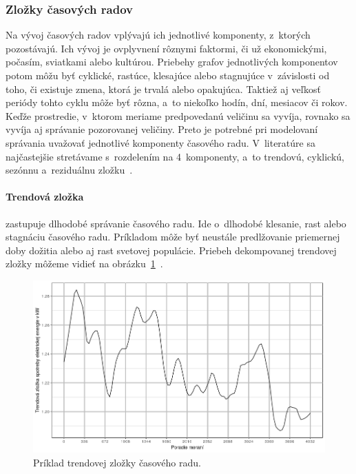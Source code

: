 \documentclass[a4paper,twoside,slovak,12pt,appendix]{article}
\begin{document}

\subsubsection{Zložky časových radov}
Na vývoj časových radov vplývajú ich jednotlivé komponenty, z~ktorých
pozostávajú. Ich vývoj je ovplyvnení rôznymi faktormi, či už ekonomickými,
počasím, sviatkami alebo kultúrou. Priebehy grafov jednotlivých komponentov
potom môžu byť cyklické, rastúce, klesajúce alebo stagnujúce v~závislosti od
toho, či existuje zmena, ktorá je trvalá alebo opakujúca. Taktiež aj veľkosť
periódy tohto cyklu môže byť rôzna, a~to niekoľko hodín, dní, mesiacov či
rokov. Keďže prostredie, v~ktorom meriame predpovedanú veličinu sa vyvíja,
rovnako sa vyvíja aj správanie pozorovanej veličiny. Preto je potrebné pri
modelovaní správania uvažovať jednotlivé komponenty časového radu. V~literatúre
sa najčastejšie stretávame s~rozdelením na 4~komponenty, a~to trendovú,
cyklickú, sezónnu a~reziduálnu zložku~\cite{Grmanova2016}.

\paragraph{Trendová zložka} zastupuje dlhodobé správanie časového radu. Ide
o~dlhodobé klesanie, rast alebo stagnáciu časového radu. Príkladom môže byť
neustále predlžovanie priemernej doby dožitia alebo aj rast svetovej populácie.
Priebeh dekompovanej trendovej zložky môžeme vidieť na
obrázku~\ref{fig:trend-component}~\cite{Agrawal2013}.

\begin{figure}[H]
  \centering
  \includegraphics[width=\textwidth]{trend_component.png}
  \caption{Príklad trendovej zložky časového radu.}
  \label{fig:trend-component}
\end{figure}
\end{document}
